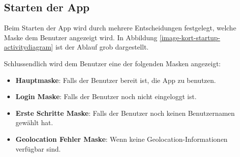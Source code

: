 \subsection{Starten der App}
Beim Starten der App wird durch mehrere Entscheidungen festgelegt, welche Maske dem Benutzer angezeigt wird. In Abbildung \ref{image-kort-startup-activitydiagram} ist der Ablauf grob dargestellt.

Schlussendlich wird dem Benutzer eine der folgenden Masken angezeigt:

\begin{itemize}
\item \textbf{Hauptmaske}: Falls der Benutzer bereit ist, die App zu benutzen.
\item \textbf{Login Maske}: Falls der Benutzer noch nicht eingeloggt ist.
\item \textbf{Erste Schritte Maske}: Falls der Benutzer noch keinen Benutzernamen gewählt hat.
\item \textbf{Geolocation Fehler Maske}: Wenn keine Geolocation-Informationen verfügbar sind.
\end{itemize}

